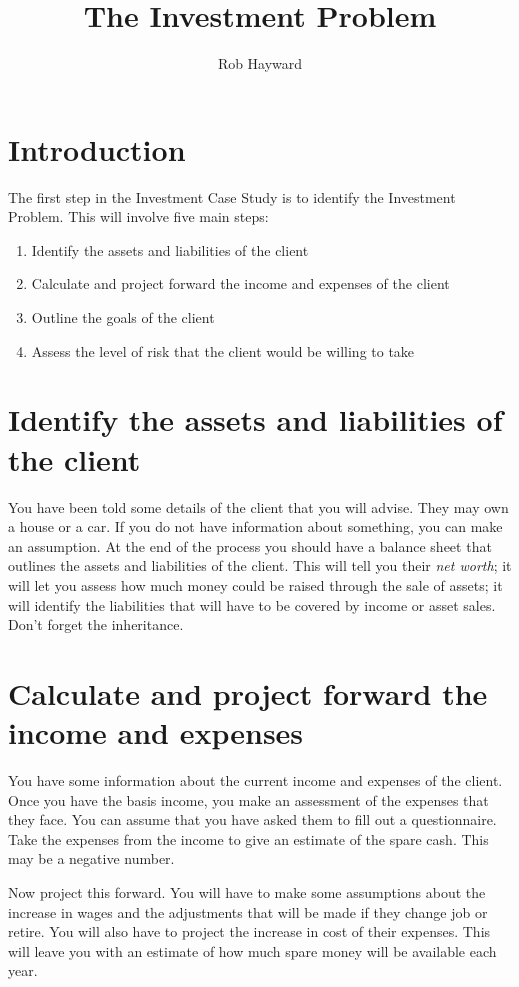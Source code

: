 \documentclass[12pt, a4paper, oneside]{article}\usepackage[]{graphicx}\usepackage[]{color}
\begin{document}
\title{The Investment Problem}
\author{Rob Hayward}
\maketitle
\section{Introduction}
The first step in the Investment Case Study is to identify the Investment Problem. This will involve five main steps:
\begin{enumerate}
\item Identify the assets and liabilities of the client
\item Calculate and project forward the income and expenses of the client
\item Outline the goals of the client
\item Assess the level of risk that the client would be willing to take
\end{enumerate}

\section{Identify the assets and liabilities of the client}
You have been told some details of the client that you will advise.  They may own a house or a car.  If you do not have information about something, you can make an assumption.  At the end of the process you should have a balance sheet that outlines the assets and liabilities of the client.  This will tell you their \emph{net worth}; it will let you assess how much money could be raised through the sale of assets; it will identify the liabilities that will have to be covered by income or asset sales.  Don't forget the inheritance. 

\section{Calculate and project forward the income and expenses}
You have some information about the current income and expenses of the client. Once you have the basis income, you make an assessment of the expenses that they face.  You can assume that you have asked them to fill out a questionnaire. Take the expenses from the income to give an estimate of the spare cash.  This may be a negative number.  

Now project this forward.  You will have to make some assumptions about the increase in wages and the adjustments that will be made if they change job or retire.  You will also have to project the increase in cost of their expenses. This will leave you with an estimate of how much spare money will be available each year. 
\end{document}
